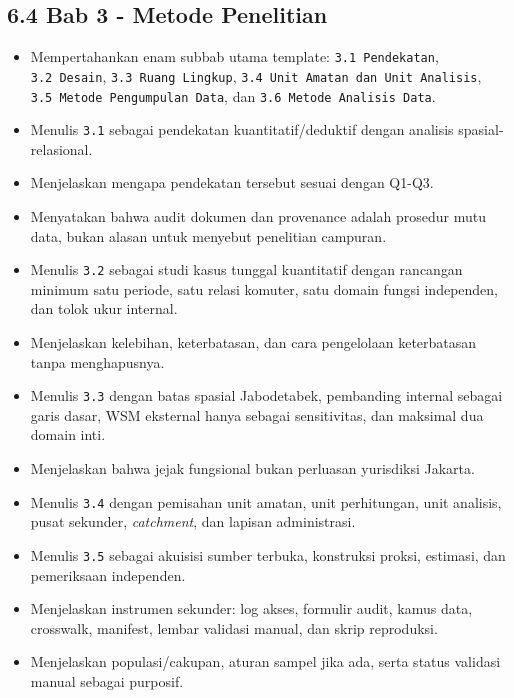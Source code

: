 \documentclass[
  indonesian,
  11pt,
]{article}
\providecommand{\tightlist}{%
  \setlength{\itemsep}{0pt}\setlength{\parskip}{0pt}}
\renewcommand{\tightlist}{%
  \setlength{\itemsep}{0.22em}%
  \setlength{\parskip}{0pt}%
}
\begin{document}
\subsection{6.4 Bab 3 - Metode
Penelitian}\label{bab-3---metode-penelitian}

\begin{itemize}
\tightlist
\item[$\square$]
  Mempertahankan enam subbab utama template: \texttt{3.1\ Pendekatan},
  \texttt{3.2\ Desain}, \texttt{3.3\ Ruang\ Lingkup},
  \texttt{3.4\ Unit\ Amatan\ dan\ Unit\ Analisis},
  \texttt{3.5\ Metode\ Pengumpulan\ Data}, dan
  \texttt{3.6\ Metode\ Analisis\ Data}.
\item[$\square$]
  Menulis \texttt{3.1} sebagai pendekatan kuantitatif/deduktif dengan
  analisis spasial-relasional.
\item[$\square$]
  Menjelaskan mengapa pendekatan tersebut sesuai dengan Q1-Q3.
\item[$\square$]
  Menyatakan bahwa audit dokumen dan provenance adalah prosedur mutu
  data, bukan alasan untuk menyebut penelitian campuran.
\item[$\square$]
  Menulis \texttt{3.2} sebagai studi kasus tunggal kuantitatif dengan
  rancangan minimum satu periode, satu relasi komuter, satu domain
  fungsi independen, dan tolok ukur internal.
\item[$\square$]
  Menjelaskan kelebihan, keterbatasan, dan cara pengelolaan keterbatasan
  tanpa menghapusnya.
\item[$\square$]
  Menulis \texttt{3.3} dengan batas spasial Jabodetabek, pembanding
  internal sebagai garis dasar, WSM eksternal hanya sebagai
  sensitivitas, dan maksimal dua domain inti.
\item[$\square$]
  Menjelaskan bahwa jejak fungsional bukan perluasan yurisdiksi Jakarta.
\item[$\square$]
  Menulis \texttt{3.4} dengan pemisahan unit amatan, unit perhitungan,
  unit analisis, pusat sekunder, \emph{catchment}, dan lapisan
  administrasi.
\item[$\square$]
  Menulis \texttt{3.5} sebagai akuisisi sumber terbuka, konstruksi
  proksi, estimasi, dan pemeriksaan independen.
\item[$\square$]
  Menjelaskan instrumen sekunder: log akses, formulir audit, kamus data,
  crosswalk, manifest, lembar validasi manual, dan skrip reproduksi.
\item[$\square$]
  Menjelaskan populasi/cakupan, aturan sampel jika ada, serta status
  validasi manual sebagai purposif.

\end{itemize}
\end{document}
